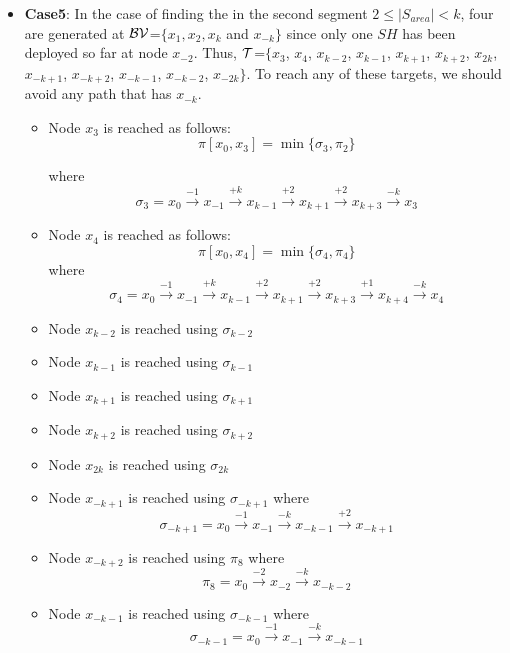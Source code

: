 \begin{itemize}
\item {\bf Case5}: In the case of finding the \bv in the second segment $2\leq |S_{area}| <k$, four \bvs are generated at $\cal BV$=$\{x_1,x_2,x_k$ and $x_{-k}\}$ since only one $SH$ has been deployed so far at node $x_{-2}$. Thus,
$\cal T$=$\{ x_{3}$,  $x_{4}$, $x_{k-2}$, $x_{k-1}$, $x_{k+1}$, $x_{k+2}$, $x_{2k}$, $x_{-k+1}$, $x_{-k+2}$, $x_{-k-1}$, $x_{-k-2}$, $x_{-2k} \}$. To reach any of these targets, we should avoid any path that has $x_{-k}$.
\begin{itemize}
\item Node $x_{3}$ is reached as follows:
$$ \pi[x_0,x_{3}] = \min \{   \sigma_{3}, \pi_{2}\}$$ 

where 
$$\sigma_{3} = x_{0} \xrightarrow {-1} x_{-1} \xrightarrow {+k} x_{k-1} \xrightarrow {+2} x_{k+1} \xrightarrow {+2}  x_{k+3}\xrightarrow {-k}  x_{3}$$

\item Node $x_{4}$ is reached as follows:
$$ \pi[x_0,x_{4}] = \min \{   \sigma_{4}, \pi_{4}\}$$ 
 where 
$$\sigma_{4} = x_{0} \xrightarrow {-1} x_{-1} \xrightarrow {+k} x_{k-1} \xrightarrow {+2} x_{k+1} \xrightarrow {+2}  x_{k+3}\xrightarrow {+1}  x_{k+4}\xrightarrow {-k}  x_{4}$$

\item Node $x_{k-2}$ is reached using $\sigma_{k-2}$ 

\item Node $x_{k-1}$ is reached using $\sigma_{k-1}$ 

\item Node $x_{k+1}$ is reached using $\sigma_{k+1}$ 

\item Node $x_{k+2}$ is reached using $\sigma_{k+2}$ 


\item Node $x_{2k}$ is reached using $\sigma_{2k}$ 

\item Node $x_{-k+1}$ is reached using $\sigma_{-k+1}$  where 
$$\sigma_{-k+1} = x_{0} \xrightarrow {-1} x_{-1} \xrightarrow {-k} x_{-k-1} \xrightarrow {+2} x_{-k+1} $$

\item Node $x_{-k+2}$ is reached using $\pi_8$ where
$$\pi_{8} = x_{0} \xrightarrow {-2} x_{-2} \xrightarrow {-k} x_{-k-2} $$



\item Node $x_{-k-1}$ is reached using $\sigma_{-k-1}$  where 
$$\sigma_{-k-1} = x_{0} \xrightarrow {-1} x_{-1} \xrightarrow {-k} x_{-k-1} $$


\end{itemize}
\end{itemize}
